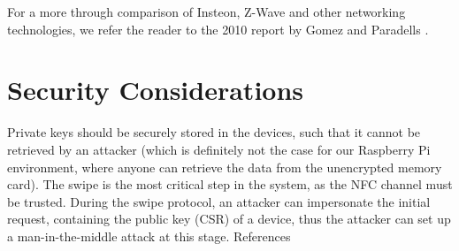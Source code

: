 For a more through comparison of Insteon, Z-Wave and other networking technologies, we refer the reader to the 2010 report by Gomez and Paradells \cite{comparison-of-technologies}.

\section{Security Considerations}

Private keys should be securely stored in the devices, such that it cannot be retrieved by an attacker (which is definitely not the case for our Raspberry Pi environment, where anyone can retrieve the data from the unencrypted memory card).
The swipe is the most critical step in the system, as the NFC channel must be trusted. During the swipe protocol, an attacker can impersonate the initial request, containing the public key (CSR) of a device, thus the attacker can set up a man-in-the-middle attack at this stage.
References
